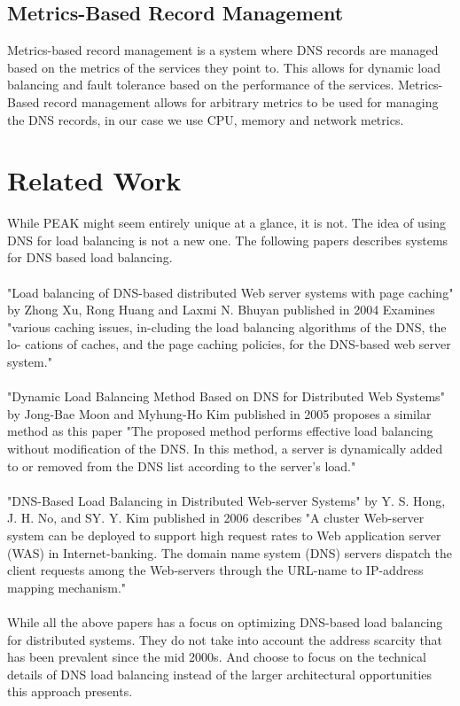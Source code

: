 \documentclass[12pt]{article}
\begin{document}
\subsection{Metrics-Based Record Management}
    Metrics-based record management is a system where DNS records are managed based on the metrics of the services they point to.
    This allows for dynamic load balancing and fault tolerance based on the performance of the services. Metrics-Based record management
    allows for arbitrary metrics to be used for managing the DNS records, in our case we use CPU, memory and network metrics.

\section{Related Work}
While PEAK might seem entirely unique at a glance, it is not. The idea of using DNS for load balancing is not a new one.
The following papers describes systems for DNS based load balancing.
\\
\\
"Load balancing of DNS-based distributed Web server systems with page caching"\cite{xuLoadBalancingDNSbased2004} by Zhong Xu, Rong Huang and Laxmi N. Bhuyan published in 2004
Examines "various caching issues, in-cluding the load balancing algorithms of the DNS, the lo-
cations of caches, and the page caching policies, for the DNS-based web server system."
\\
\\
"Dynamic Load Balancing Method Based on DNS for Distributed Web Systems"\cite{moonDynamicLoadBalancing2005} 
by Jong-Bae Moon and Myhung-Ho Kim published in 2005
proposes a similar method as this paper "The proposed
method performs effective load balancing without modification of the
DNS. In this method, a server is dynamically added to or removed from
the DNS list according to the server’s load."
\\
\\
"DNS-Based Load Balancing in Distributed Web-server Systems"\cite{hongDNSbasedLoadBalancing2006} by Y. S. Hong, J. H. No, and SY. Y. Kim
published in 2006 describes "A cluster Web-server system can be deployed to support high request rates to Web application server (WAS) in Internet-banking. 
The domain name system (DNS) servers dispatch the client requests among the Web-servers through the URL-name to IP-address mapping mechanism."
\\
\\
While all the above papers has a focus on optimizing DNS-based load balancing for distributed systems.
They do not take into account the address scarcity that has been prevalent since the mid 2000s.
And choose to focus on the technical details of DNS load balancing instead of the larger architectural
opportunities this approach presents.
\end{document}
